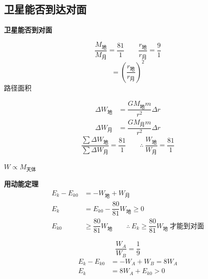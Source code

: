 \subsection{卫星能否到达对面}
\textbf{卫星能否到对面}

\[ \dfrac{M_{\text{地}}}{M_{\text{月}}}=\dfrac{81}{1}\qquad \dfrac{r_{\text{地}}}{r_{\text{月}}}=\dfrac{9}{1} \]
\[ =\left(\dfrac{r_{\text{地}}}{r_{\text{月}}}\right)^{2} \]
路径面积

\begin{align*}
\Delta W_{\text{地}}&=\dfrac{GM_{\text{地}}m}{r^{2}}\Delta r\\
\Delta W_{\text{月}}&=\dfrac{GM_{\text{月}}m}{r^{2}}\Delta r
\end{align*}
\[ \dfrac{\sum\Delta W_{\text{地}}}{\sum\Delta W_{\text{月}}}=\dfrac{81}{1}\qquad \therefore\ \dfrac{W_{\text{地}}}{W_{\text{月}}}=\dfrac{81}{1} \]

\textbf{$W\propto M_{\text{天体}}$}

\textbf{用动能定理}
\begin{align*}
E_k-E_{k0}&=-W_{\text{地}}+W_{\text{月}}\\
E_k&=E_{k0}-\dfrac{80}{81}W_{\text{地}}\ge 0\\
E_{k0}&\ge\dfrac{80}{81}W_{\text{地}}\qquad \therefore\ E_k\ge\dfrac{80}{81}W_{\text{地}}\ \text{才能到对面}
\end{align*}

\[ \dfrac{W_A}{W_B}=\dfrac{1}{9} \]
\begin{align*}
E_k-E_{k0}&=-W_A+W_B=8W_A\\
E_k&=8W_A+E_{k0}>0
\end{align*}


